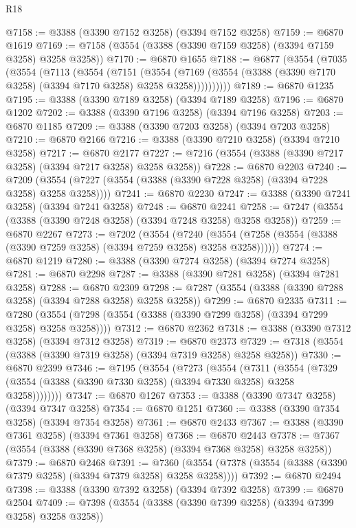 \begin{lexlean}{R18}
\begin{coremodule}
@7158 := @3388 (@3390 @7152 @3258) (@3394 @7152 @3258)
@7159 := @6870 @1619
@7169 := @7158 (@3554 (@3388 (@3390 @7159 @3258) (@3394 @7159 @3258) @3258 @3258))
@7170 := @6870 @1655
@7188 := @6877
    (@3554
      (@7035
        (@3554
          (@7113
            (@3554
              (@7151
                (@3554
                  (@7169 (@3554 (@3388 (@3390 @7170 @3258) (@3394 @7170 @3258) @3258 @3258))))))))))
@7189 := @6870 @1235
@7195 := @3388 (@3390 @7189 @3258) (@3394 @7189 @3258)
@7196 := @6870 @1202
@7202 := @3388 (@3390 @7196 @3258) (@3394 @7196 @3258)
@7203 := @6870 @1185
@7209 := @3388 (@3390 @7203 @3258) (@3394 @7203 @3258)
@7210 := @6870 @2166
@7216 := @3388 (@3390 @7210 @3258) (@3394 @7210 @3258)
@7217 := @6870 @2177
@7227 := @7216 (@3554 (@3388 (@3390 @7217 @3258) (@3394 @7217 @3258) @3258 @3258))
@7228 := @6870 @2203
@7240 := @7209 (@3554 (@7227 (@3554 (@3388 (@3390 @7228 @3258) (@3394 @7228 @3258) @3258 @3258))))
@7241 := @6870 @2230
@7247 := @3388 (@3390 @7241 @3258) (@3394 @7241 @3258)
@7248 := @6870 @2241
@7258 := @7247 (@3554 (@3388 (@3390 @7248 @3258) (@3394 @7248 @3258) @3258 @3258))
@7259 := @6870 @2267
@7273 := @7202
    (@3554
      (@7240 (@3554 (@7258 (@3554 (@3388 (@3390 @7259 @3258) (@3394 @7259 @3258) @3258 @3258))))))
@7274 := @6870 @1219
@7280 := @3388 (@3390 @7274 @3258) (@3394 @7274 @3258)
@7281 := @6870 @2298
@7287 := @3388 (@3390 @7281 @3258) (@3394 @7281 @3258)
@7288 := @6870 @2309
@7298 := @7287 (@3554 (@3388 (@3390 @7288 @3258) (@3394 @7288 @3258) @3258 @3258))
@7299 := @6870 @2335
@7311 := @7280 (@3554 (@7298 (@3554 (@3388 (@3390 @7299 @3258) (@3394 @7299 @3258) @3258 @3258))))
@7312 := @6870 @2362
@7318 := @3388 (@3390 @7312 @3258) (@3394 @7312 @3258)
@7319 := @6870 @2373
@7329 := @7318 (@3554 (@3388 (@3390 @7319 @3258) (@3394 @7319 @3258) @3258 @3258))
@7330 := @6870 @2399
@7346 := @7195
    (@3554
      (@7273
        (@3554
          (@7311
            (@3554 (@7329 (@3554 (@3388 (@3390 @7330 @3258) (@3394 @7330 @3258) @3258 @3258))))))))
@7347 := @6870 @1267
@7353 := @3388 (@3390 @7347 @3258) (@3394 @7347 @3258)
@7354 := @6870 @1251
@7360 := @3388 (@3390 @7354 @3258) (@3394 @7354 @3258)
@7361 := @6870 @2433
@7367 := @3388 (@3390 @7361 @3258) (@3394 @7361 @3258)
@7368 := @6870 @2443
@7378 := @7367 (@3554 (@3388 (@3390 @7368 @3258) (@3394 @7368 @3258) @3258 @3258))
@7379 := @6870 @2468
@7391 := @7360 (@3554 (@7378 (@3554 (@3388 (@3390 @7379 @3258) (@3394 @7379 @3258) @3258 @3258))))
@7392 := @6870 @2494
@7398 := @3388 (@3390 @7392 @3258) (@3394 @7392 @3258)
@7399 := @6870 @2504
@7409 := @7398 (@3554 (@3388 (@3390 @7399 @3258) (@3394 @7399 @3258) @3258 @3258))

\end{coremodule}
\end{lexlean}
